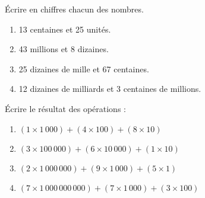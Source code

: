 \begin{colonne*exercice}
\bigskip

\begin{exercice}
   Écrire en chiffres chacun des nombres.
   \begin{enumerate}
      \item 13 centaines et 25 unités.
      \item 43 millions et 8 dizaines.
      \item 25 dizaines de mille et 67 centaines.
      \item 12 dizaines de milliards et 3 centaines de millions.
   \end{enumerate}
\end{exercice}

\bigskip

\begin{exercice}
  Écrire le résultat des opérations :
   \begin{enumerate}
      \item $(1\times1\,000) + (4\times100) + (8\times10)$
      \item $(3\times100\,000) + (6\times10\,000) + (1\times10)$
      \item $(2\times1\,000\,000) + (9\times1\,000) + (5\times1)$
      \item $(7\times1\,000\,000\,000) + (7\times1\,000) + (3\times100)$
   \end{enumerate}
\end{exercice}




\end{colonne*exercice}
